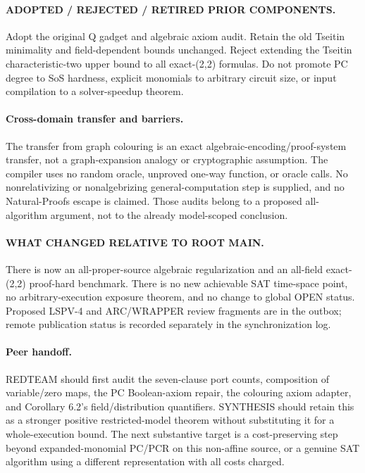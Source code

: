 \documentclass[11pt]{article}
\begin{document}
\paragraph{ADOPTED / REJECTED / RETIRED PRIOR COMPONENTS.}
Adopt the original Q gadget and algebraic axiom audit. Retain the old Tseitin
minimality and field-dependent bounds unchanged. Reject extending the
Tseitin characteristic-two upper bound to all exact-(2,2) formulas. Do not
promote PC degree to SoS hardness, explicit monomials to arbitrary circuit
size, or input compilation to a solver-speedup theorem.

\paragraph{Cross-domain transfer and barriers.}
The transfer from graph colouring is an exact algebraic-encoding/proof-system
transfer, not a graph-expansion analogy or cryptographic assumption. The
compiler uses no random oracle, unproved one-way function, or oracle calls.
No nonrelativizing or nonalgebrizing general-computation step is supplied, and
no Natural-Proofs escape is claimed. Those audits belong to a proposed
all-algorithm argument, not to the already model-scoped conclusion.

\paragraph{WHAT CHANGED RELATIVE TO ROOT MAIN.}
There is now an all-proper-source algebraic regularization and an all-field
exact-(2,2) proof-hard benchmark. There is no new achievable SAT time-space
point, no arbitrary-execution exposure theorem, and no change to global OPEN
status. Proposed LSPV-4 and ARC/WRAPPER review fragments are in the outbox;
remote publication status is recorded separately in the synchronization log.

\paragraph{Peer handoff.}
REDTEAM should first audit the seven-clause port counts, composition of
variable/zero maps, the PC Boolean-axiom repair, the colouring axiom adapter,
and Corollary 6.2's field/distribution quantifiers. SYNTHESIS should retain
this as a stronger positive restricted-model theorem without substituting it
for a whole-execution bound. The next substantive target is a cost-preserving
step beyond expanded-monomial PC/PCR on this non-affine source, or a genuine
SAT algorithm using a different representation with all costs charged.

\clearpage


\end{document}
